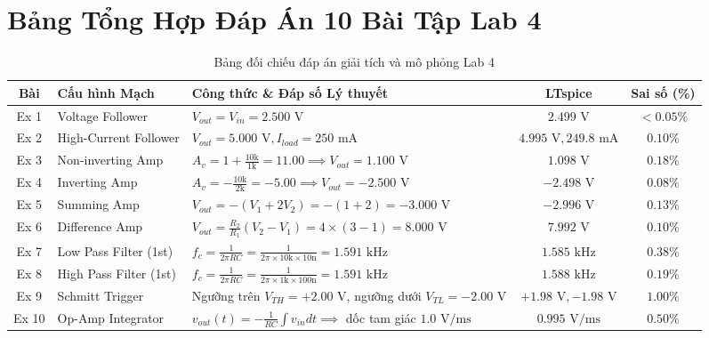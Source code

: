 \documentclass[12pt,a4paper]{report}
\begin{document}
\section{Bảng Tổng Hợp Đáp Án 10 Bài Tập Lab 4}
\begin{table}[H]
\centering
\caption{Bảng đối chiếu đáp án giải tích và mô phỏng Lab 4}
\label{tab:ans_lab4}
\renewcommand{\arraystretch}{1.2}
\small
\begin{tabularx}{\textwidth}{|c|p{4.2cm}|X|c|c|}
\hline
\rowcolor{codebg}
\textbf{Bài} & \textbf{Cấu hình Mạch} & \textbf{Công thức \& Đáp số Lý thuyết} & \textbf{LTspice} & \textbf{Sai số (\%)} \\ \hline
Ex 1 & Voltage Follower & $V_{out} = V_{in} = 2.500\text{ V}$ & $2.499\text{ V}$ & $<0.05\%$ \\ \hline
Ex 2 & High-Current Follower & $V_{out} = 5.000\text{ V}, I_{load} = 250\text{ mA}$ & $4.995\text{ V}, 249.8\text{ mA}$ & $0.10\%$ \\ \hline
Ex 3 & Non-inverting Amp & $A_v = 1 + \frac{10\text{k}}{1\text{k}} = 11.00 \implies V_{out} = 1.100\text{ V}$ & $1.098\text{ V}$ & $0.18\%$ \\ \hline
Ex 4 & Inverting Amp & $A_v = -\frac{10\text{k}}{2\text{k}} = -5.00 \implies V_{out} = -2.500\text{ V}$ & $-2.498\text{ V}$ & $0.08\%$ \\ \hline
Ex 5 & Summing Amp & $V_{out} = -(V_1 + 2V_2) = -(1 + 2) = -3.000\text{ V}$ & $-2.996\text{ V}$ & $0.13\%$ \\ \hline
Ex 6 & Difference Amp & $V_{out} = \frac{R_2}{R_1}(V_2 - V_1) = 4 \times (3 - 1) = 8.000\text{ V}$ & $7.992\text{ V}$ & $0.10\%$ \\ \hline
Ex 7 & Low Pass Filter (1st) & $f_c = \frac{1}{2\pi R C} = \frac{1}{2\pi \times 10\text{k} \times 10\text{n}} = 1.591\text{ kHz}$ & $1.585\text{ kHz}$ & $0.38\%$ \\ \hline
Ex 8 & High Pass Filter (1st) & $f_c = \frac{1}{2\pi R C} = \frac{1}{2\pi \times 1\text{k} \times 100\text{n}} = 1.591\text{ kHz}$ & $1.588\text{ kHz}$ & $0.19\%$ \\ \hline
Ex 9 & Schmitt Trigger & Ngưỡng trên $V_{TH} = +2.00\text{ V}$, ngưỡng dưới $V_{TL} = -2.00\text{ V}$ & $+1.98\text{ V}, -1.98\text{ V}$ & $1.00\%$ \\ \hline
Ex 10 & Op-Amp Integrator & $v_{out}(t) = -\frac{1}{R C}\int v_{in} dt \implies$ dốc tam giác $1.0\text{ V/ms}$ & $0.995\text{ V/ms}$ & $0.50\%$ \\ \hline
\end{tabularx}
\end{table}
\end{document}
